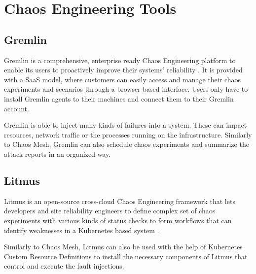 \section{Chaos Engineering Tools}

\subsection{Gremlin}

Gremlin is a comprehensive, enterprise ready Chaos Engineering platform to enable its users to proactively improve their systems' reliability \cite{Gremlin}. It is provided with a SaaS model, where customers can easily access and manage their chaos experiments and scenarios through a browser based interface. Users only have to install Gremlin agents to their machines and connect them to their Gremlin account.

Gremlin is able to inject many kinds of failures into a system. These can impact resources, network traffic or the processes running on the infrastructure. Similarly to Chaos Mesh, Gremlin can also schedule chaos experiments and summarize the attack reports in an organized way.

\subsection{Litmus}

Litmus is an open-source cross-cloud Chaos Engineering framework that lets developers and site reliability engineers to define complex set of chaos experiments with various kinds of status checks to form workflows that can identify weaknesses in a Kubernetes based system \cite{Litmus}.

Similarly to Chaos Mesh, Litmus can also be used with the help of Kubernetes Custom Resource Definitions to install the necessary components of Litmus that control and execute the fault injections.
